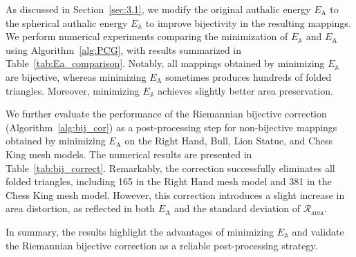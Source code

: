 \documentclass{article}
\numberwithin{equation}{section}
\def\rA{\mathrm{A}}
\def\bbA{\mathbb{A}}
\begin{document}
{

As discussed in Section~\ref{sec:3.1}, we modify the original authalic energy $E_\rA$ to the spherical authalic energy $E_\bbA$ to improve bijectivity in the resulting mappings. We perform numerical experiments comparing the minimization of $E_\bbA$ and $E_\rA$ using Algorithm~\ref{alg:PCG}, with results summarized in Table~\ref{tab:Ea_comparison}. Notably, all mappings obtained by minimizing $E_\bbA$ are bijective, whereas minimizing $E_\rA$ sometimes produces hundreds of folded triangles. Moreover, minimizing $E_\bbA$ achieves slightly better area preservation.

We further evaluate the performance of the Riemannian bijective correction (Algorithm~\ref{alg:bij_cor}) as a post-processing step for non-bijective mappings obtained by minimizing $E_\rA$ on the Right Hand, Bull, Lion Statue, and Chess King mesh models. The numerical results are presented in Table~\ref{tab:bij_correct}. Remarkably, the correction successfully eliminates all folded triangles, including 165 in the Right Hand mesh model and 381 in the Chess King mesh model. However, this correction introduces a slight increase in area distortion, as reflected in both $E_\rA$ and the standard deviation of $\mathcal{R}_\mathrm{area}$. 

In summary, the results highlight the advantages of minimizing $E_\bbA$ and validate the Riemannian bijective correction as a reliable post-processing strategy.

}
\end{document}
